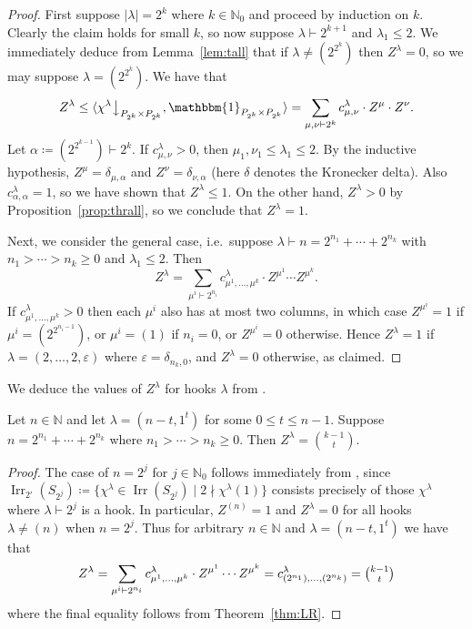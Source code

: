 \documentclass[ALCO, Unicode]{cedram}
\newcommand{\triv}{\mathbbm{1}}
\newcommand{\Irr}{\operatorname{Irr}}
\newcommand{\down}{\big\downarrow}
\newcommand{\N}{\mathbb{N}}
\begin{document}
\begin{proof}
	First suppose $|\lambda|=2^k$ where $k\in\N_0$ and proceed by induction on $k$. Clearly the claim holds for small $k$, so now suppose $\lambda\vdash 2^{k+1}$ and $\lambda_1\le 2$. We immediately deduce from Lemma~\ref{lem:tall} that if $\lambda\ne(2^{2^k})$ then $Z^\lambda=0$, so we may suppose $\lambda=(2^{2^k})$. We have that
	\[ Z^\lambda \le \langle \chi^\lambda\down_{P_{2^k}\times P_{2^k}}, \triv_{P_{2^k}\times P_{2^k}}\rangle = \sum_{\mu,\nu\vdash 2^k} c^\lambda_{\mu,\nu} \cdot Z^\mu\cdot Z^\nu. \]
	Let $\alpha\coloneqq (2^{2^{k-1}})\vdash 2^k$. If $c^\lambda_{\mu,\nu}>0$, then $\mu_1,\nu_1\le\lambda_1\le 2$. By the inductive hypothesis, $Z^\mu=\delta_{\mu,\alpha}$ and $Z^\nu=\delta_{\nu,\alpha}$ (here $\delta$ denotes the Kronecker delta). Also $c^\lambda_{\alpha,\alpha}=1$, so we have shown that $Z^\lambda\le 1$. 
	On the other hand, $Z^\lambda>0$ by Proposition~\ref{prop:thrall}, so we conclude that $Z^\lambda=1$.
	
	Next, we consider the general case, i.e.~suppose $\lambda\vdash n=2^{n_1}+\cdots+2^{n_k}$ with $n_1>\cdots>n_k\ge 0$ and $\lambda_1\le 2$. Then
	\[ Z^\lambda = \sum_{\mu^i\vdash 2^{n_i}} c^\lambda_{\mu^1,\dotsc,\mu^k}\cdot Z^{\mu^1}\cdots Z^{\mu^k}. \]
	If $c^\lambda_{\mu^1,\dotsc,\mu^k}>0$ then each $\mu^i$ also has at most two columns, in which case $Z^{\mu^i}=1$ if $\mu^i=(2^{2^{n_i-1}})$, or $\mu^i=(1)$ if $n_i=0$, or $Z^{\mu^i}=0$ otherwise. Hence $Z^\lambda=1$ if $\lambda=(2,\dotsc,2,\varepsilon)$ where $\varepsilon=\delta_{n_k,0}$, and $Z^\lambda=0$ otherwise, as claimed.
\end{proof}

We deduce the values of $Z^\lambda$ for hooks $\lambda$ from \cite{G}.
\begin{proposition}\label{prop:hook}
	Let $n\in\N$ and let $\lambda=(n-t,1^t)$ for some $0\le t\le n-1$. Suppose $n=2^{n_1}+\cdots+2^{n_k}$ where $n_1>\cdots>n_k\ge 0$. Then $Z^\lambda=\binom{k-1}{t}$.
\end{proposition}
\begin{proof}
	The case of $n=2^j$ for $j\in\N_0$ follows immediately from \cite[Theorem 1.1]{G}, since $\Irr_{2'}(S_{2^j})\coloneqq \{\chi^\lambda\in\Irr(S_{2^j}) \mid 2\nmid\chi^\lambda(1) \}$ consists precisely of those $\chi^\lambda$ where $\lambda\vdash 2^j$ is a hook. In particular, $Z^{(n)}=1$ and $Z^\lambda=0$ for all hooks $\lambda\ne(n)$ when $n=2^j$. Thus for arbitrary $n\in\N$ and $\lambda=(n-t,1^t)$ we have that
	\[ Z^\lambda = \sum_{\mu^i\vdash 2^{n_i}} c^\lambda_{\mu^1,\dotsc,\mu^k}\cdot Z^{\mu^1}\cdots Z^{\mu^k} = c^\lambda_{(2^{n_1}),\dotsc,(2^{n_k})} = \tbinom{k-1}{t} \]
	where the final equality follows from Theorem~\ref{thm:LR}.
\end{proof}
\end{document}
